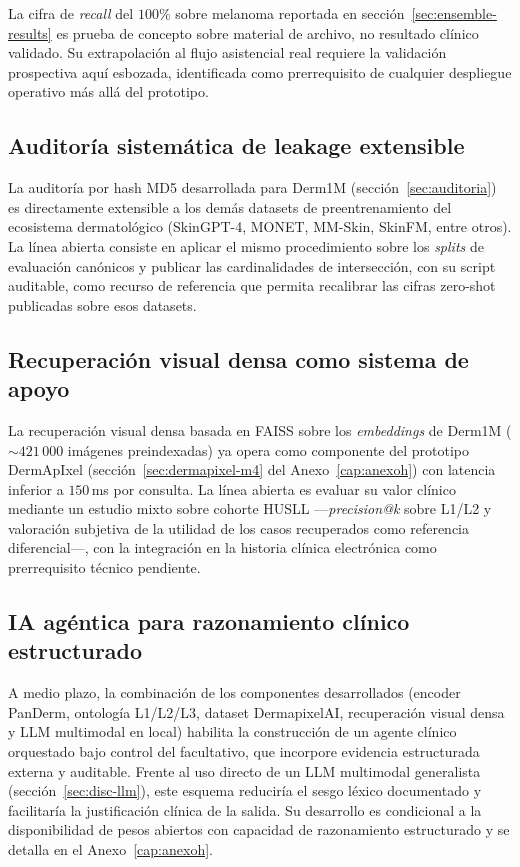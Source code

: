 La cifra de \emph{recall} del $100\%$ sobre melanoma reportada
en sección~\ref{sec:ensemble-results} es prueba de concepto sobre
material de archivo, no resultado clínico validado. Su
extrapolación al flujo asistencial real requiere la validación
prospectiva aquí esbozada, identificada como prerrequisito de
cualquier despliegue operativo más allá del prototipo.

\subsection{Auditoría sistemática de leakage extensible}
\label{sec:linea-leakage}

La auditoría por hash MD5 desarrollada para Derm1M
(sección~\ref{sec:auditoria}) es directamente extensible a los demás
datasets de preentrenamiento del ecosistema dermatológico (SkinGPT-4,
MONET, MM-Skin, SkinFM, entre otros). La línea abierta consiste en
aplicar el mismo procedimiento sobre los \emph{splits} de evaluación
canónicos y publicar las cardinalidades de intersección, con su
script auditable, como recurso de referencia que permita recalibrar
las cifras zero-shot publicadas sobre esos datasets.

\subsection{Recuperación visual densa como sistema de apoyo}
\label{sec:linea-rag}

La recuperación visual densa basada en FAISS sobre los
\emph{embeddings} de Derm1M ($\sim 421\,000$ imágenes preindexadas)
ya opera como componente del prototipo DermApIxel
(sección~\ref{sec:dermapixel-m4} del Anexo~\ref{cap:anexoh}) con
latencia inferior a $150$\,ms por consulta. La línea abierta es
evaluar su valor clínico mediante un estudio mixto sobre cohorte
HUSLL ---\emph{precision@k} sobre L1/L2 y valoración subjetiva de la
utilidad de los casos recuperados como referencia diferencial---, con
la integración en la historia clínica electrónica como prerrequisito
técnico pendiente.

\subsection{IA agéntica para razonamiento clínico estructurado}
\label{sec:linea-agentica}

A medio plazo, la combinación de los componentes desarrollados
(encoder PanDerm, ontología L1/L2/L3, dataset DermapixelAI,
recuperación visual densa y LLM multimodal en local) habilita la
construcción de un agente clínico orquestado bajo control del
facultativo, que incorpore evidencia estructurada externa y
auditable. Frente al uso directo de un LLM multimodal generalista
(sección~\ref{sec:disc-llm}), este esquema reduciría el sesgo
léxico documentado y facilitaría la justificación clínica de la
salida. Su desarrollo es condicional a la disponibilidad de pesos
abiertos con capacidad de razonamiento estructurado y se detalla en
el Anexo~\ref{cap:anexoh}.

